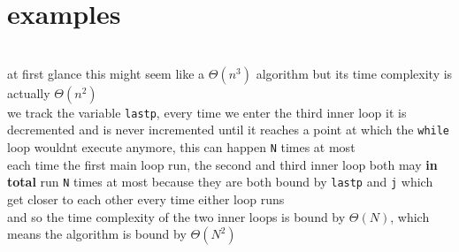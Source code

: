 \documentclass[a4paper,12pt]{article}
\newcommand{\?}{\stackrel{?}{=}}
\begin{document}
\section{examples}
\label{sec:org69cae2b}
\begin{my_example}
\\[0pt]

at first glance this might seem like a \(\Theta\left(n^3\right)\) algorithm but its time complexity is actually \(\Theta\left(n^2\right)\)\\[0pt]
we track the variable \texttt{lastp}, every time we enter the third inner loop it is decremented and is never incremented until it reaches a point at which the \texttt{while} loop wouldnt execute anymore, this can happen \texttt{N} times at most\\[0pt]
each time the first main loop run, the second and third inner loop both may \textbf{in total} run \texttt{N} times at most because they are both bound by \texttt{lastp} and \texttt{j} which get closer to each other every time either loop runs\\[0pt]
and so the time complexity of the two inner loops is bound by \(\Theta(N)\), which means the algorithm is bound by \(\Theta(N^2)\)\\[0pt]
\end{my_example}
\end{document}
